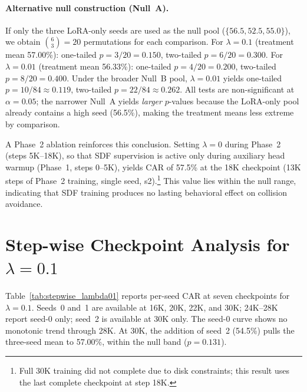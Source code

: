 \paragraph{Alternative null construction (Null~A).}
If only the three LoRA-only seeds are used as the null pool ($\{56.5, 52.5, 55.0\}$), we obtain $\binom{6}{3} = 20$ permutations for each comparison. For $\lambda = 0.1$ (treatment mean 57.00\%): one-tailed $p = 3/20 = 0.150$, two-tailed $p = 6/20 = 0.300$. For $\lambda = 0.01$ (treatment mean 56.33\%): one-tailed $p = 4/20 = 0.200$, two-tailed $p = 8/20 = 0.400$. Under the broader Null~B pool, $\lambda = 0.01$ yields one-tailed $p = 10/84 \approx 0.119$, two-tailed $p = 22/84 \approx 0.262$. All tests are non-significant at $\alpha = 0.05$; the narrower Null~A yields \emph{larger} $p$-values because the LoRA-only pool already contains a high seed (56.5\%), making the treatment means less extreme by comparison.

A Phase~2 ablation reinforces this conclusion. Setting $\lambda = 0$ during Phase~2 (steps 5K--18K), so that SDF supervision is active only during auxiliary head warmup (Phase~1, steps 0--5K), yields CAR of 57.5\% at the 18K checkpoint (13K steps of Phase~2 training, single seed, s2).\footnote{Full 30K training did not complete due to disk constraints; this result uses the last complete checkpoint at step 18K.} This value lies within the null range, indicating that SDF training produces no lasting behavioral effect on collision avoidance.

\section{Step-wise Checkpoint Analysis for \texorpdfstring{$\lambda = 0.1$}{lambda = 0.1}}
\label{sec:appendix_stepwise}

Table~\ref{tab:stepwise_lambda01} reports per-seed CAR at seven checkpoints for $\lambda = 0.1$. Seeds~0 and~1 are available at 16K, 20K, 22K, and 30K; 24K--28K report seed-0 only; seed~2 is available at 30K only. The seed-0 curve shows no monotonic trend through 28K. At 30K, the addition of seed~2 (54.5\%) pulls the three-seed mean to 57.00\%, within the null band ($p = 0.131$).

